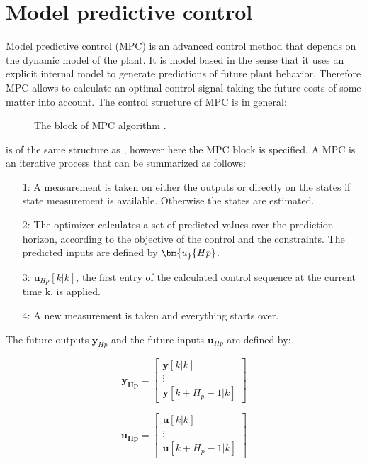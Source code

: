 \section{Model predictive control}
\label{sec:MPC}

Model predictive control (MPC) is an advanced control method that depends on the dynamic model of the plant. It is model based in the sense that it uses an explicit internal model to generate predictions of future plant behavior. Therefore MPC allows to calculate an optimal control signal taking the future costs of some matter into account. The control structure of MPC is in general:

\begin{figure}[H]
\centering
 
\caption{The block of MPC algorithm \cite{Camacho2007}.}
\label{mpc_structure}
\end{figure}

 is of the same structure as , however here the MPC block is specified. A MPC is an iterative process that can be summarized as follows: 

\begin{itemize}
\item[1:] A measurement is taken on either the outputs or directly on the states if state measurement is available. Otherwise the states are estimated. 
\item[2:] The optimizer calculates a set of predicted values over the prediction horizon, according to the objective of the control and the constraints. The predicted inputs are defined by $\bm{u_}{Hp}$.
\item[3:] $\bm{u}_{Hp}[k|k]$, the first entry of the calculated control sequence at the current time k, is applied.
\item[4:] A new measurement is taken and everything starts over. 
\end{itemize}

The future outputs $\bm{y}_{Hp}$ and the future inputs $\bm{u}_{Hp}$ are defined by:

\begin{equation}
\bm{y_{Hp}} =  
 \begin{bmatrix}
  \bm{y}[k|k]\\
  \vdots  \\
  \bm{y}[k+H_p-1|k]   
 \end{bmatrix}
\end{equation}

\begin{equation}
\bm{u_{Hp}} =  
 \begin{bmatrix}
  \bm{u}[k|k]\\
  \vdots  \\
  \bm{u}[k+H_p-1|k]   
 \end{bmatrix}
\end{equation}

